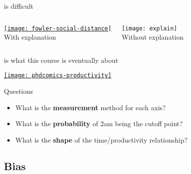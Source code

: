 \documentclass[t]{beamer}
\begin{document}
  \begin{frame}[c]{ is difficult}

    \begin{columns}[T]


      \begin{center}
        \href{http://jhfowler.ucsd.edu/alone_in_the_crowd.pdf}{\texttt{[image: fowler-social-distance]}}\\
        \vspace{0.25cm}
        With explanation
      \end{center}


      \begin{center}
        \texttt{[image: explain]}\\
        \vspace{0.25cm}
        Without explanation
      \end{center}

    \end{columns}     

  \end{frame}
  
  \begin{frame}[t]{ is what this course is eventually about}
    
    \href{http://www.phdcomics.com/comics.php?f=1219}{\texttt{[image: phdcomics-productivity]}}
    
    \begin{exampleblock}{Questions}

      \begin{itemize}
        \item What is the \textbf{measurement} method for each axis?
        \item What is the \textbf{probability} of 2am being the cutoff point?   
        \item What is the \textbf{shape} of the time/productivity relationship?
      \end{itemize}

    \end{exampleblock}
    
  \end{frame}
  
  \subsection{Bias}
  
\end{document}
